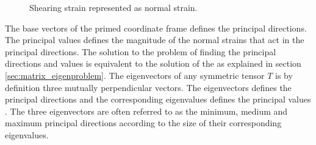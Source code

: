 \begin{figure}
  \centering
  \caption{Shearing strain represented as normal strain.}
  \label{fig:principal_direction}
\end{figure}


The base vectors of the primed coordinate frame
defines the principal directions. The principal values defines the
magnitude of the normal strains that act in the principal directions. 
The solution to the problem of finding the principal directions and values
is equivalent to the solution of the  as explained
in section \vref{sec:matrix_eigenproblem}. 
%
The eigenvectors of any symmetric tensor
$T$ is by definition three mutually perpendicular vectors. The
eigenvectors defines the
principal directions and the corresponding 
eigenvalues defines the principal values . 
The three eigenvectors are often referred to as the minimum, medium
and maximum principal directions according to the size of their
corresponding eigenvalues. \\


